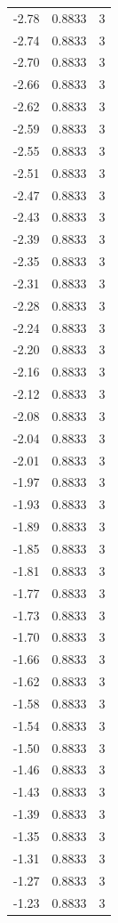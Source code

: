 \begin{longtable}{lrr}
  -2.78 & 0.8833 & 3 \\
  -2.74 & 0.8833 & 3 \\
  -2.70 & 0.8833 & 3 \\
  -2.66 & 0.8833 & 3 \\
  -2.62 & 0.8833 & 3 \\
  -2.59 & 0.8833 & 3 \\
  -2.55 & 0.8833 & 3 \\
  -2.51 & 0.8833 & 3 \\
  -2.47 & 0.8833 & 3 \\
  -2.43 & 0.8833 & 3 \\
  -2.39 & 0.8833 & 3 \\
  -2.35 & 0.8833 & 3 \\
  -2.31 & 0.8833 & 3 \\
  -2.28 & 0.8833 & 3 \\
  -2.24 & 0.8833 & 3 \\
  -2.20 & 0.8833 & 3 \\
  -2.16 & 0.8833 & 3 \\
  -2.12 & 0.8833 & 3 \\
  -2.08 & 0.8833 & 3 \\
  -2.04 & 0.8833 & 3 \\
  -2.01 & 0.8833 & 3 \\
  -1.97 & 0.8833 & 3 \\
  -1.93 & 0.8833 & 3 \\
  -1.89 & 0.8833 & 3 \\
  -1.85 & 0.8833 & 3 \\
  -1.81 & 0.8833 & 3 \\
  -1.77 & 0.8833 & 3 \\
  -1.73 & 0.8833 & 3 \\
  -1.70 & 0.8833 & 3 \\
  -1.66 & 0.8833 & 3 \\
  -1.62 & 0.8833 & 3 \\
  -1.58 & 0.8833 & 3 \\
  -1.54 & 0.8833 & 3 \\
  -1.50 & 0.8833 & 3 \\
  -1.46 & 0.8833 & 3 \\
  -1.43 & 0.8833 & 3 \\
  -1.39 & 0.8833 & 3 \\
  -1.35 & 0.8833 & 3 \\
  -1.31 & 0.8833 & 3 \\
  -1.27 & 0.8833 & 3 \\
  -1.23 & 0.8833 & 3 \\

\end{longtable}
